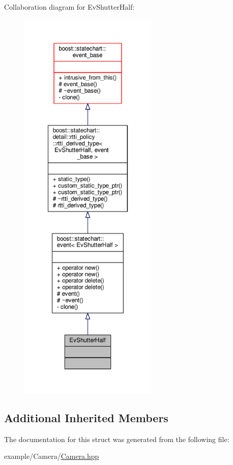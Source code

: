Collaboration diagram for Ev\+Shutter\+Half\+:
\nopagebreak
\begin{figure}[H]
\begin{center}
\leavevmode
\includegraphics[height=550pt]{struct_ev_shutter_half__coll__graph}
\end{center}
\end{figure}
\subsection*{Additional Inherited Members}


The documentation for this struct was generated from the following file\+:\begin{DoxyCompactItemize}
\item 
example/\+Camera/\mbox{\hyperlink{_camera_8hpp}{Camera.\+hpp}}\end{DoxyCompactItemize}
